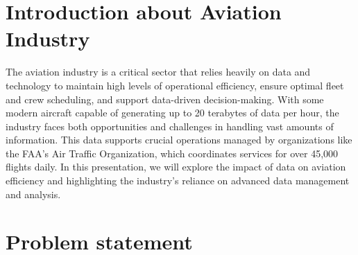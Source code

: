 \documentclass[12pt, a4paper]{article}
\begin{document}
\tableofcontents
\newpage


\section{Introduction about Aviation Industry}
The aviation industry is a critical sector that relies heavily on data and
technology to maintain high levels of operational efficiency, ensure optimal
fleet and crew scheduling, and support data-driven decision-making. With some
modern aircraft capable of generating up to 20 terabytes of data per hour, the
industry faces both opportunities and challenges in handling vast amounts of
information. This data supports crucial operations managed by organizations like
the FAA's Air Traffic Organization, which coordinates services for over 45,000
flights daily. In this presentation, we will explore the impact of data on
aviation efficiency and highlighting the industry's reliance on advanced data
management and analysis.

\section{Problem statement}
\end{document}
